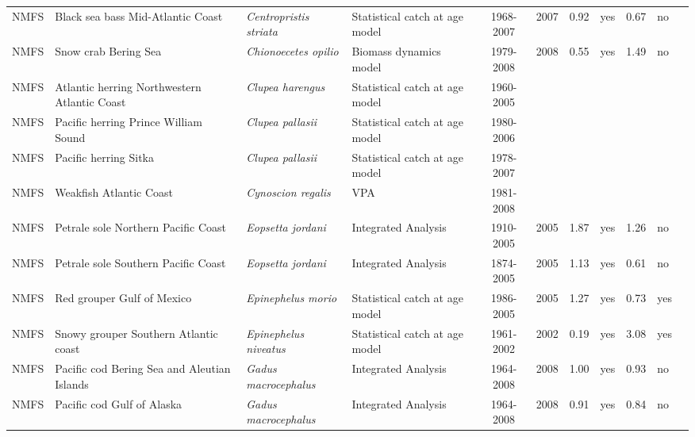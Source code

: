 \begin{longtable}{p{1.8cm}p{3.5cm}p{3.5cm}p{3cm}cccp{0.9cm}cp{0.9cm}c}
  NMFS & Black sea bass Mid-Atlantic Coast & \textit{Centropristis striata} & Statistical catch at age model & 1968-2007 & 2007 & 0.92 & yes & 0.67 & no & \cite{DataPoorReviewPanelReportFinal-1-20-09.pdf} \\ 
  NMFS & Snow crab Bering Sea & \textit{Chionoecetes opilio} & Biomass dynamics model & 1979-2008 & 2008 & 0.55 & yes & 1.49 & no & \cite{CRABSAFE2008.pdf} \\ 
  NMFS & Atlantic herring Northwestern Atlantic Coast & \textit{Clupea harengus} & Statistical catch at age model & 1960-2005 &  &  &  &  &  & \cite{Herring2006.pdf} \\ 
  NMFS & Pacific herring Prince William Sound & \textit{Clupea pallasii} & Statistical catch at age model & 1980-2006 &  &  &  &  &  & \cite{Hulson-etal-2008-ICESJM.pdf} \\ 
  NMFS & Pacific herring Sitka & \textit{Clupea pallasii} & Statistical catch at age model & 1978-2007 &  &  &  &  &  & \cite{Hulson-etal-2008-ICESJM.pdf} \\ 
  NMFS & Weakfish Atlantic Coast & \textit{Cynoscion regalis} & VPA & 1981-2008 &  &  &  &  &  & \cite{NEFSC-Weakfish-2009.pdf} \\ 
  NMFS & Petrale sole Northern Pacific Coast & \textit{Eopsetta jordani} & Integrated Analysis & 1910-2005 & 2005 & 1.87 & yes & 1.26 & no & \cite{ref2004-SAFE-WCpetralesole.pdf} \\ 
  NMFS & Petrale sole Southern Pacific Coast & \textit{Eopsetta jordani} & Integrated Analysis & 1874-2005 & 2005 & 1.13 & yes & 0.61 & no & \cite{ref2004-SAFE-WCpetralesole.pdf} \\ 
  NMFS & Red grouper Gulf of Mexico & \textit{Epinephelus morio} & Statistical catch at age model & 1986-2005 & 2005 & 1.27 & yes & 0.73 & yes & \cite{JENSEN-RGROUPGM-2006.pdf} \\ 
  NMFS & Snowy grouper Southern Atlantic coast & \textit{Epinephelus niveatus} & Statistical catch at age model & 1961-2002 & 2002 & 0.19 & yes & 3.08 & yes & \cite{ref2004-SEDAR-deepwatersnappergrouper.pdf} \\ 
  NMFS & Pacific cod Bering Sea and Aleutian Islands & \textit{Gadus macrocephalus} & Integrated Analysis & 1964-2008 & 2008 & 1.00 & yes & 0.93 & no & \cite{AFSC-PCODBSAI-2008-Pacific-cod-BSAI.pdf} \\ 
  NMFS & Pacific cod Gulf of Alaska & \textit{Gadus macrocephalus} & Integrated Analysis & 1964-2008 & 2008 & 0.91 & yes & 0.84 & no & \cite{AFSC-PCODGA-2008-Pacific-cod-GA.pdf} \\ 

\end{longtable}
